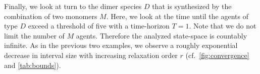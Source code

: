 
Finally, we look at turn to the dimer species $D$ that is synthesized
by the combination of
two monomers $M$. Here, we look at the time until the agents of type
$D$ exceed a threshold of five
with a time-horizon $T=1$. Note that we do not limit the number of
$M$ agents. Therefore
the analyzed state-space is countably infinite. As in the previous
two examples, we
observe a roughly exponential decrease in interval size with
increasing relaxation
order $r$ (cf.\ \autoref{fig:convergence} and \autoref{tab:bounds}).

